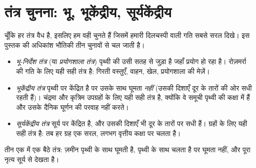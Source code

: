 \section{तंत्र चुनना: भू, भूकेंद्रीय, सूर्यकेंद्रीय}

चूँकि हर तंत्र वैध है, इसलिए हम वही चुनते हैं जिसमें हमारी दिलचस्पी वाली
गति सबसे सरल दिखे। इस पुस्तक की अधिकांश भौतिकी तीन चुनावों से चल जाती है।

\begin{definition}[तीन मानक तंत्र]\label{def:g10:relative-motion:frames}
\begin{itemize}
  \item \emph{भू-निर्देश तंत्र} (या
        \emph{प्रयोगशाला तंत्र}) पृथ्वी की उसी
        सतह से जुड़ा है जहाँ प्रयोग हो रहा है। रोज़मर्रा की गति के लिए
        यही सही तंत्र है: गिरती वस्तुएँ, वाहन, खेल, प्रयोगशाला की मेज़ें।
  \item \emph{भूकेंद्रीय तंत्र} पृथ्वी पर
        केंद्रित है पर उसके साथ घूमता \emph{नहीं} (उसकी दिशाएँ दूर के
        तारों की ओर सधी रहती हैं)। चंद्रमा और कृत्रिम उपग्रहों
        के लिए यही सही तंत्र है, क्योंकि वे समूची पृथ्वी की
        कक्षा में हैं और उसके दैनिक घूर्णन की परवाह नहीं करते।
  \item \emph{सूर्यकेंद्रीय तंत्र} सूर्य पर
        केंद्रित है, और उसकी दिशाएँ भी दूर के तारों पर सधी हैं। ग्रहों
        के लिए यही सही तंत्र है: तब हर ग्रह एक सरल, लगभग वृत्तीय
        कक्षा पर चलता है।
\end{itemize}
\end{definition}

\begin{omfigure}

{\small तीन एक में एक बैठे तंत्र: ज़मीन पृथ्वी के साथ घूमती है,
 पृथ्वी के साथ चलता है पर घूमता नहीं, और
 पूरा नृत्य सूर्य से देखता है।}
\end{omfigure}


